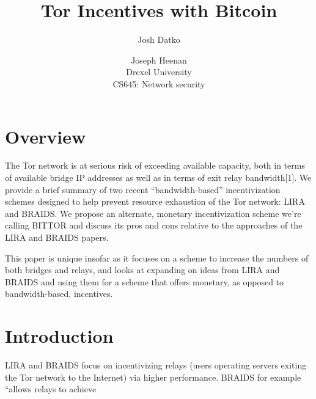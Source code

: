 \documentclass[letterpaper]{article}
\begin{document}
\setcounter{secnumdepth}{1}
\title{Tor Incentives with Bitcoin}
\author{Josh Datko \and Joseph Heenan\\ Drexel University\\
CS645: Network security\\
}
\maketitle

\section{Overview}\label{sec:overview}

The Tor network is at serious risk of exceeding available capacity,
both in terms of available bridge IP addresses as well as in terms of
exit relay bandwidth[1]. We provide a brief summary of two recent
“bandwidth-based” incentivization schemes designed to help prevent
resource exhaustion of the Tor network: LIRA and BRAIDS. We propose an
alternate, monetary incentivization scheme we’re calling BITTOR and
discuss its pros and cons relative to the approaches of the LIRA and
BRAIDS papers.

This paper is unique insofar as it focuses on a scheme to increase the
numbers of both bridges and relays, and looks at expanding on ideas
from LIRA and BRAIDS and using them for a scheme that offers monetary,
as opposed to bandwidth-based, incentives.

\section{Introduction}\label{sec:intro}

LIRA and BRAIDS focus on incentivizing relays (users operating servers
exiting the Tor network to the Internet) via higher
performance. BRAIDS for example “allows relays to achieve
\end{document}

